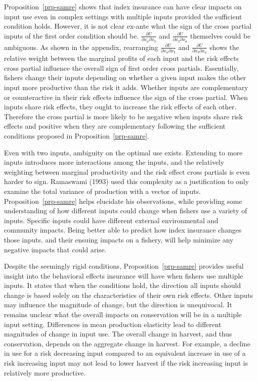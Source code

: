 \documentclass[
  letterpaper,
  DIV=11,
  numbers=noendperiod]{scrartcl}
\theoremstyle{plain}
\theoremstyle{plain}
\theoremstyle{remark}
\begin{document}
Proposition~\ref{prp-samre} shows that index insurance can have clear
impacts on input use even in complex settings with multiple inputs
provided the sufficient condition holds. However, it is not clear
ex-ante what the sign of the cross partial inputs of the first order
condition should be. \(\frac{\partial U}{\partial x_a\partial x_b}\) and
\(\frac{\partial U}{\partial x_b\partial x_a}\) themselves could be
ambiguous. As shown in the appendix, rearranging
\(\frac{\partial U}{\partial x_a\partial x_b}\) and
\(\frac{\partial U}{\partial x_b\partial x_a}\) shows the relative
weight between the marginal profits of each input and the risk effects
cross partial influence the overall sign of first order cross partials.
Essentially, fishers change their inputs depending on whether a given
input makes the other input more productive than the risk it adds.
Whether inputs are complementary or counteractive in their risk effects
influence the sign of the cross partial. When inputs share risk effects,
they ought to increase the risk effects of each other. Therefore the
cross partial is more likely to be negative when inputs share risk
effects and positive when they are complementary following the
sufficient conditions proposed in Proposition~\ref{prp-samre}.

Even with two inputs, ambiguity on the optimal use exists. Extending to
more inputs introduces more interactions among the inputs, and the
relatively weighting between marginal productivity and the risk effect
cross partials is even harder to sign. Ramaswami (1993) used this
complexity as a justification to only examine the total variance of
production with a vector of inputs. Proposition~\ref{prp-samre} helps
elucidate his observations, while providing some understanding of how
different inputs could change when fishers use a variety of inputs.
Specific inputs could have different external environmental and
community impacts. Being better able to predict how index insurance
changes those inputs, and their ensuing impacts on a fishery, will help
minimize any negative impacts that could arise.

Despite the seemingly rigid conditions, Proposition~\ref{prp-samre}
provides useful insight into the behavioral effects insurance will have
when fishers use multiple inputs. It states that when the conditions
hold, the direction all inputs should change is based solely on the
characteristics of their own risk effects. Other inputs may influence
the magnitude of change, but the direction is unequivocal. It remains
unclear what the overall impacts on conservation will be in a multiple
input setting. Differences in mean production elasticity lead to
different magnitudes of change in input use. The overall change in
harvest, and thus conservation, depends on the aggregate change in
harvest. For example, a decline in use for a risk decreasing input
compared to an equivalent increase in use of a risk increasing input may
not lead to lower harvest if the risk increasing input is relatively
more productive.
\end{document}
